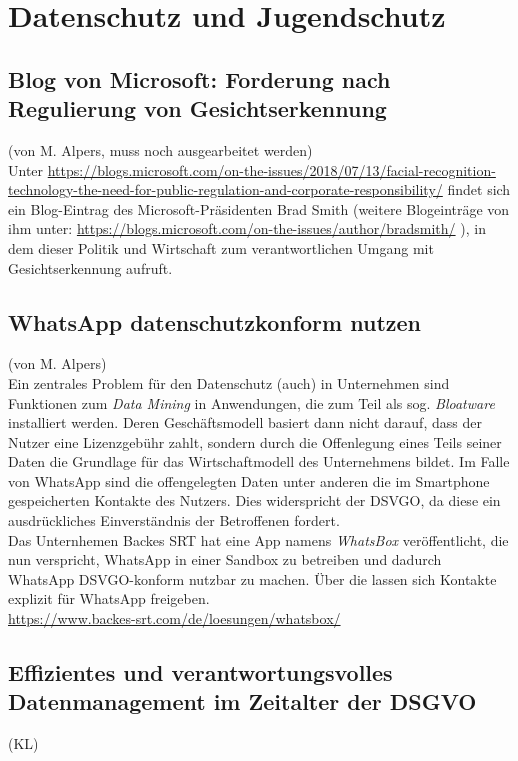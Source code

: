 \section{Datenschutz und Jugendschutz}

\subsection{Blog von Microsoft: Forderung nach Regulierung von Gesichtserkennung}
(von M. Alpers, muss noch ausgearbeitet werden)\\

Unter \url{https://blogs.microsoft.com/on-the-issues/2018/07/13/facial-recognition-technology-the-need-for-public-regulation-and-corporate-responsibility/} findet sich ein Blog-Eintrag des Microsoft-Präsidenten Brad Smith (weitere Blogeinträge von ihm unter: \url{https://blogs.microsoft.com/on-the-issues/author/bradsmith/} ), in dem dieser Politik und Wirtschaft zum verantwortlichen Umgang mit Gesichtserkennung aufruft.

\subsection{WhatsApp datenschutzkonform nutzen}
(von M. Alpers)\\

Ein zentrales Problem für den Datenschutz (auch) in Unternehmen sind Funktionen zum \emph{Data Mining} in Anwendungen, die zum Teil als sog. \emph{Bloatware} installiert werden. Deren Geschäftsmodell basiert dann nicht darauf, dass der Nutzer eine Lizenzgebühr zahlt, sondern durch die Offenlegung eines Teils seiner Daten die Grundlage für das Wirtschaftmodell des Unternehmens bildet. Im Falle von WhatsApp sind die offengelegten Daten unter anderen die im Smartphone gespeicherten Kontakte des Nutzers. Dies widerspricht der DSVGO, da diese ein ausdrückliches Einverständnis der Betroffenen fordert.\\

\glqq{}Das Unternhemen  Backes SRT hat eine App namens \emph{WhatsBox} veröffentlicht,\grqq{} die nun verspricht, WhatsApp in einer Sandbox zu betreiben und dadurch WhatsApp DSVGO-konform nutzbar zu machen. Über die lassen sich Kontakte explizit für WhatsApp freigeben.\\

\url{https://www.backes-srt.com/de/loesungen/whatsbox/}


\subsection{Effizientes und verantwortungsvolles
Datenmanagement im
Zeitalter der DSGVO}
(KL)\\

